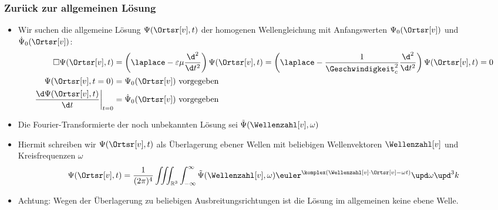  \begin{frame}
  \frametitle{Zurück zur allgemeinen Lösung}
  \begin{itemize}[<+->]
  \item Wir suchen die \alert{allgemeine Lösung} \(\Psi(\Ortsr[v],t)\) der \alert{homogenen Wellengleichung} mit \alert{Anfangswerten} \(\Psi_0(\Ortsr[v])\) und \(\dot{\Psi}_0(\Ortsr[v])\):
    \begin{align*}
      \square\Psi(\Ortsr[v],t) &= \left(\laplace - \varepsilon\mu\frac{\d^2}{\d t^2}\right)\Psi(\Ortsr[v],t) = \left(\laplace - \frac{1}{\Geschwindigkeit_c^2}\frac{\d^2}{\d t^2}\right)\Psi(\Ortsr[v],t) = 0\\
      \Psi(\Ortsr[v],t=0) &= \Psi_0(\Ortsr[v]) \text{ vorgegeben}\\
      \left.\frac{\d \Psi(\Ortsr[v],t)}{\d t}\right|_{t=0} &= \dot{\Psi}_0(\Ortsr[v]) \text{ vorgegeben}
    \end{align*}
  \item Die Fourier-Transformierte der noch unbekannten Lösung sei \(\tilde{\Psi}(\Wellenzahl[v], \omega)\)
  \item Hiermit schreiben wir \(\Psi(\Ortsr[v], t)\) als \alert{Überlagerung ebener Wellen} mit beliebigen Wellenvektoren \(\Wellenzahl[v]\) und Kreisfrequenzen \(\omega\)
    \begin{equation*}
      \Psi(\Ortsr[v], t) = \frac{1}{(2\pi)^4} \iiint_{\mathbb{R}^3} \int_{-\infty}^\infty \tilde{\Psi}(\Wellenzahl[v], \omega) \euler^{\komplex(\Wellenzahl[v]\cdot\Ortsr[v]-\omega t)} \upd \omega \upd^3k  
    \end{equation*}
    \item Achtung: Wegen der Überlagerung zu beliebigen Ausbreitungsrichtungen ist die Lösung im allgemeinen \alert{keine ebene Welle}.
    \end{itemize}
  \end{frame}

